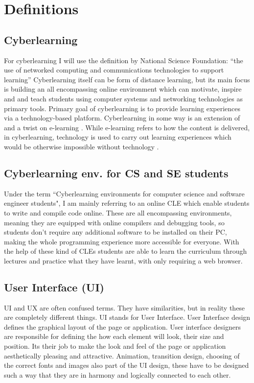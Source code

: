 \documentclass[10pt,english,a4paper]{article}
\begin{document}
\section{Definitions}\label{definitions}

\subsection{Cyberlearning}
For cyberlearning I will use the definition by National Science Foundation: 
``the use of networked computing and communications technologies to support learning” \cite{borgman_2017_fostering} 
Cyberlearning itself can be form of distance learning, but its main focus is building an all 
encompassing online environment which can motivate, inspire and and teach students using 
computer systems and networking technologies as primary tools\cite{ui/ux}.
Primary goal of cyberlearning is to provide learning experiences via a technology-based platform. 
Cyberlearning in some way is an extension of and a twist on e-learning \cite{lynch_2020_cyberlearning}.
While e-learning refers to how the content is delivered, in cyberlearning, technology
is used to carry out learning experiences which would be otherwise impossible without technology \cite{lynch_2020_cyberlearning}.

\subsection{Cyberlearning env. for CS and SE students}
Under the term ``Cyberlearning environments for computer science and software engineer students", I am mainly
referring to an online CLE which enable students to write and compile code online. These are all encompassing
environments, meaning they are equipped with 
online compilers and debugging tools, so students don't require any additional software to be installed on their PC, making
the whole programming experience more accessible for everyone.
With the help of these kind of CLEs students are able to learn the curriculum through lectures and practice
what they have learnt, with only requiring a web browser.

\subsection{User Interface (UI)}
UI and UX are often confused terms\cite{theymakedesign_2019_what}. They have similarities, but in reality
these are completely different things.
UI stands for User Interface. User Interface design defines the graphical layout of the page or application.
User interface designers are responsible for defining the how each element will look, their size and position.
Its their job to make the look and feel of the page or application aesthetically pleasing and 
attractive. Animation, transition design, choosing of the correct fonts and images also part of the UI design, 
these have to be designed such a way that they are in harmony and logically connected to each other\cite{theymakedesign_2019_what}.
\end{document}
